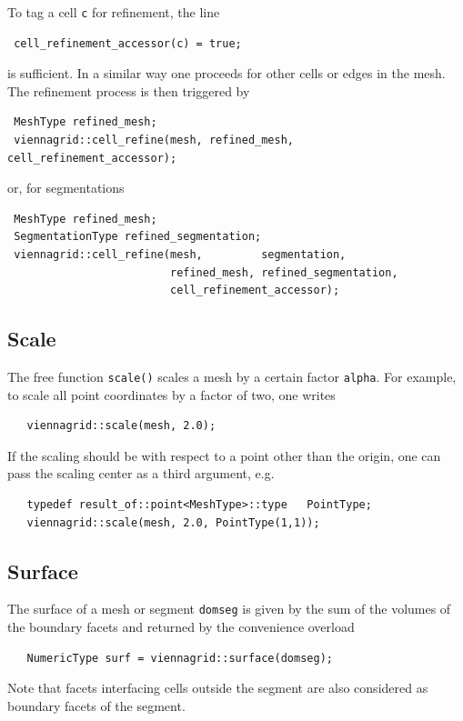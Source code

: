  To tag a cell \lstinline|c| for refinement, the line
 \begin{lstlisting}
 cell_refinement_accessor(c) = true;
 \end{lstlisting}
 is sufficient. In a similar way one proceeds for other cells or edges in the mesh. The refinement process is then triggered by
 \begin{lstlisting}
 MeshType refined_mesh;
 viennagrid::cell_refine(mesh, refined_mesh, cell_refinement_accessor);
 \end{lstlisting}

 \pagebreak

 or, for segmentations
 \begin{lstlisting}
 MeshType refined_mesh;
 SegmentationType refined_segmentation;
 viennagrid::cell_refine(mesh,         segmentation,
                         refined_mesh, refined_segmentation,
                         cell_refinement_accessor);
 \end{lstlisting}


 \subsection{Scale}
 The free function \lstinline|scale()| scales a mesh by a certain factor \lstinline|alpha|. For example, to scale all point coordinates by a factor of two, one writes
  \begin{lstlisting}
   viennagrid::scale(mesh, 2.0);
  \end{lstlisting}
  If the scaling should be with respect to a point other than the origin, one can pass the scaling center as a third argument, e.g.
  \begin{lstlisting}
   typedef result_of::point<MeshType>::type   PointType;
   viennagrid::scale(mesh, 2.0, PointType(1,1));
  \end{lstlisting}

 \subsection{Surface}
 The surface of a mesh or segment \lstinline|domseg| is given by the sum of the volumes of the boundary facets and returned by the convenience overload
  \begin{lstlisting}
   NumericType surf = viennagrid::surface(domseg);
  \end{lstlisting}
  Note that facets interfacing cells outside the segment are also considered as boundary facets of the segment.

